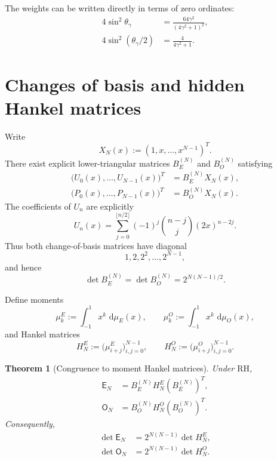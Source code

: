 \documentclass[11pt]{amsart}
\numberwithin{equation}{section}
\theoremstyle{plain}
\newtheorem{theorem}{Theorem}[section]
\theoremstyle{definition}
\theoremstyle{remark}
\newcommand{\RH}{\mathrm{RH}}
\newcommand{\E}{\mathsf E}
\newcommand{\Omat}{\mathsf O}
\newcommand{\dd}{\,\mathrm d}
\begin{document}
The weights can be written directly in terms of zero ordinates:
\begin{align}
4\sin^2\theta_\gamma
&=\frac{64\gamma^2}{(4\gamma^2+1)^2},
\label{eq:E_weight_gamma}\\
4\sin^2(\theta_\gamma/2)
&=\frac{4}{4\gamma^2+1}.
\label{eq:O_weight_gamma}
\end{align}

\section{Changes of basis and hidden Hankel matrices}
\label{sec:changes_of_basis}

Write
\begin{equation}
X_N(x):=(1,x,\dots,x^{N-1})^T.
\label{eq:monomial_vector}
\end{equation}
There exist explicit lower-triangular matrices $B_E^{(N)}$ and $B_O^{(N)}$ satisfying
\begin{align}
\bigl(U_0(x),\dots,U_{N-1}(x)\bigr)^T
&=B_E^{(N)}X_N(x),
\label{eq:CE_basis_change}\\
\bigl(P_0(x),\dots,P_{N-1}(x)\bigr)^T
&=B_O^{(N)}X_N(x).
\label{eq:CO_basis_change}
\end{align}
The coefficients of $U_n$ are explicitly
\begin{equation}
U_n(x)=
\sum_{j=0}^{\lfloor n/2\rfloor}
(-1)^j\binom{n-j}{j}(2x)^{n-2j}.
\label{eq:U_explicit_coefficients}
\end{equation}
Thus both change-of-basis matrices have diagonal
\begin{equation}
1,2,2^2,\dots,2^{N-1},
\label{eq:C_diagonal}
\end{equation}
and hence
\begin{equation}
\det B_E^{(N)}=\det B_O^{(N)}=2^{N(N-1)/2}.
\label{eq:C_determinants}
\end{equation}

Define moments
\begin{equation}
\mu_k^E:=\int_{-1}^{1}x^k\,\dd\mu_E(x),
\qquad
\mu_k^O:=\int_{-1}^{1}x^k\,\dd\mu_O(x),
\label{eq:moment_sequences}
\end{equation}
and Hankel matrices
\begin{equation}
H_N^E:=\bigl(\mu_{i+j}^E\bigr)_{i,j=0}^{N-1},
\qquad
H_N^O:=\bigl(\mu_{i+j}^O\bigr)_{i,j=0}^{N-1}.
\label{eq:hidden_hankel_matrices}
\end{equation}

\begin{theorem}[Congruence to moment Hankel matrices]
\label{thm:hankel_congruence}
Under $\RH$,
\begin{align}
\E_N&=B_E^{(N)}H_N^E(B_E^{(N)})^T,
\label{eq:E_hankel_congruence}\\
\Omat_N&=B_O^{(N)}H_N^O(B_O^{(N)})^T.
\label{eq:O_hankel_congruence}
\end{align}
Consequently,
\begin{align}
\det\E_N&=2^{N(N-1)}\det H_N^E,
\label{eq:E_hankel_det_relation}\\
\det\Omat_N&=2^{N(N-1)}\det H_N^O.
\label{eq:O_hankel_det_relation}
\end{align}
\end{theorem}
\end{document}
